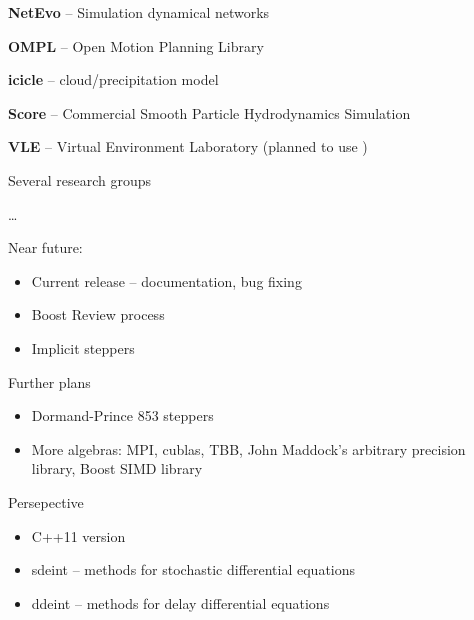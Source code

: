 \begin{frame}[fragile]
 

\vspace{2ex}


\textbf{NetEvo} -- Simulation dynamical networks

\vspace{2ex}
\textbf{OMPL} -- Open Motion Planning Library

\vspace{2ex}
\textbf{icicle} -- cloud/precipitation model

\vspace{2ex}
\textbf{Score} -- Commercial Smooth Particle Hydrodynamics Simulation

\vspace{2ex}
\textbf{VLE} -- Virtual Environment Laboratory (planned to use \odeint )

\vspace{2ex}
Several research groups

\vspace{2ex}
\dots


\end{frame}





\begin{frame}

 \vspace{2ex}

Near future:
\begin{itemize}
\item Current release -- documentation, bug fixing
\item Boost Review process
\item Implicit steppers
\end{itemize}

\vspace{2ex}
Further plans 
\begin{itemize}
 \item Dormand-Prince 853 steppers
 \item More algebras: MPI, cublas, TBB, John Maddock's arbitrary precision library, Boost SIMD library
\end{itemize}

\vspace{2ex}                                                                                                       
Persepective
\begin{itemize}
 \item C++11 version
 \item sdeint -- methods for stochastic differential equations
 \item ddeint -- methods for delay differential equations
\end{itemize}







\end{frame}

